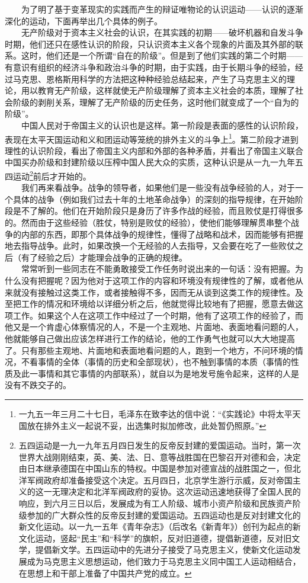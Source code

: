 \documentclass[cn,11pt,chinese]{elegantbook}
\begin{document}
　　为了明了基于变革现实的实践而产生的辩证唯物论的认识运动——认识的逐渐深化的运动，下面再举出几个具体的例子。\\
　　无产阶级对于资本主义社会的认识，在其实践的初期——破坏机器和自发斗争时期，他们还只在感性认识的阶段，只认识资本主义各个现象的片面及其外部的联系。这时，他们还是一个所谓“自在的阶级”。但是到了他们实践的第二个时期——有意识有组织的经济斗争和政治斗争的时期，由于实践，由于长期斗争的经验，经过马克思、恩格斯用科学的方法把这种种经验总结起来，产生了马克思主义的理论，用以教育无产阶级，这样就使无产阶级理解了资本主义社会的本质，理解了社会阶级的剥削关系，理解了无产阶级的历史任务，这时他们就变成了一个“自为的阶级”。\\
　　中国人民对于帝国主义的认识也是这样。第一阶段是表面的感性的认识阶段，表现在太平天国运动和义和团运动等笼统的排外主义的斗争上\footnote[5]{ 一九五一年三月二十七日，毛泽东在致李达的信中说：“《实践论》中将太平天国放在排外主义一起说不妥，出选集时拟加修改，此处暂仍照原。”}。第二阶段才进到理性的认识阶段，看出了帝国主义内部和外部的各种矛盾，并看出了帝国主义联合中国买办阶级和封建阶级以压榨中国人民大众的实质，这种认识是从一九一九年五四运动\footnote[6]{ 五四运动是一九一九年五月四日发生的反帝反封建的爱国运动。当时，第一次世界大战刚刚结束，英、美、法、日、意等战胜国在巴黎召开对德和会，决定由日本继承德国在中国山东的特权。中国是参加对德宣战的战胜国之一，但北洋军阀政府却准备接受这个决定。五月四日，北京学生游行示威，反对帝国主义的这一无理决定和北洋军阀政府的妥协。这次运动迅速地获得了全国人民的响应，到六月三日以后，发展成为有工人阶级、城市小资产阶级和民族资产阶级参加的广大群众性的反帝反封建的爱国运动。五四运动也是反对封建文化的新文化运动。以一九一五年《青年杂志》（后改名《新青年》）创刊为起点的新文化运动，竖起“民主”和“科学”的旗帜，反对旧道德，提倡新道德，反对旧文学，提倡新文学。五四运动中的先进分子接受了马克思主义，使新文化运动发展成为马克思主义思想运动，他们致力于马克思主义同中国工人运动相结合，在思想上和干部上准备了中国共产党的成立。}前后才开始的。\\
　　我们再来看战争。战争的领导者，如果他们是一些没有战争经验的人，对于一个具体的战争（例如我们过去十年的土地革命战争）的深刻的指导规律，在开始阶段是不了解的。他们在开始阶段只是身历了许多作战的经验，而且败仗是打得很多的。然而由于这些经验（胜仗，特别是败仗的经验），使他们能够理解贯串整个战争的内部的东西，即那个具体战争的规律性，懂得了战略和战术，因而能够有把握地去指导战争。此时，如果改换一个无经验的人去指导，又会要在吃了一些败仗之后（有了经验之后）才能理会战争的正确的规律。\\
　　常常听到一些同志在不能勇敢接受工作任务时说出来的一句话：没有把握。为什么没有把握呢？因为他对于这项工作的内容和环境没有规律性的了解，或者他从来就没有接触过这类工作，或者接触得不多，因而无从谈到这类工作的规律性。及至把工作的情况和环境给以详细分析之后，他就觉得比较地有了把握，愿意去做这项工作。如果这个人在这项工作中经过了一个时期，他有了这项工作的经验了，而他又是一个肯虚心体察情况的人，不是一个主观地、片面地、表面地看问题的人，他就能够自己做出应该怎样进行工作的结论，他的工作勇气也就可以大大地提高了。只有那些主观地、片面地和表面地看问题的人，跑到一个地方，不问环境的情况，不看事情的全体（事情的历史和全部现状），也不触到事情的本质（事情的性质及此一事情和其它事情的内部联系），就自以为是地发号施令起来，这样的人是没有不跌交子的。\\
\end{document}
